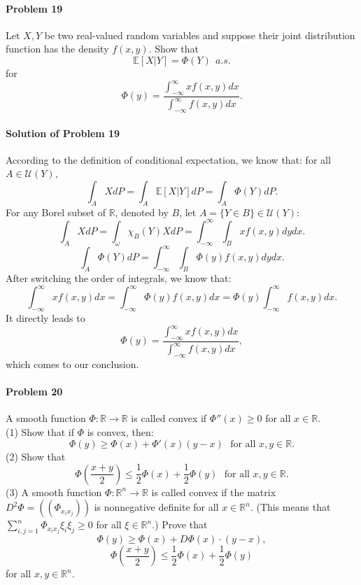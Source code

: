 \documentclass{article}
\begin{document}
\paragraph{Problem 19} Let $X,Y$ be two real-valued random variables and suppose their joint distribution function has the density $f(x,y)$. Show that 
\[\mathbb{E}[X|Y]=\Phi(Y)~~a.s.\]
for
\[\Phi(y)=\frac{\int_{-\infty}^{\infty}xf(x,y)dx}{\int_{-\infty}^{\infty}f(x,y)dx}.\]

\paragraph{Solution of Problem 19} According to the definition of conditional expectation, we know that: for all $A\in\mathcal U(Y)$,
\[\int_A XdP=\int_A \mathbb{E}[X|Y] dP = \int_A \Phi(Y)dP.\]
For any Borel subset of $\mathbb{R}$, denoted by $B$, let $A=\{Y\in B\}\in \mathcal U(Y)$:
\[\int_A XdP=\int_{\omega}\chi_B(Y)XdP=\int_{-\infty}^{\infty}\int_B xf(x,y)dydx.\]
\[\int_A \Phi(Y)dP = \int_{-\infty}^{\infty} \int_B \Phi(y)f(x,y)dydx.\]
After switching the order of integrals, we know that:
\[\int_{-\infty}^{\infty}xf(x,y)dx = \int_{-\infty}^{\infty}\Phi(y)f(x,y)dx = \Phi(y)\int_{-\infty}^{\infty}f(x,y)dx.\]
It directly leads to
\[\Phi(y) = \frac{\int_{-\infty}^{\infty}xf(x,y)dx}{\int_{-\infty}^{\infty}f(x,y)dx},\]
which comes to our conclusion.  

\paragraph{Problem 20} A smooth function $\Phi:\mathbb{R}\rightarrow\mathbb{R}$ is called convex if $\Phi''(x)\geqslant 0$ for all $x\in\mathbb{R}$.\\
(1) Show that if $\Phi$ is convex, then:
\[\Phi(y)\geqslant \Phi(x)+\Phi'(x)(y-x)~~~\text{for all }x,y\in\mathbb{R}.\]
(2) Show that 
\[\Phi\left(\frac{x+y}{2}\right)\leqslant \frac12\Phi(x)+\frac12\Phi(y)~~~\text{for all }x,y\in\mathbb{R}.\]
(3) A smooth function $\Phi:\mathbb{R}^n\rightarrow\mathbb{R}$ is called convex if the matrix $D^2\Phi=((\Phi_{x_i x_j}))$ is nonnegative definite for all $x\in\mathbb{R}^n$. (This means that $\sum_{i,j=1}^n \Phi_{x_i x_j}\xi_i\xi_j\geqslant 0$ for all $\xi\in\mathbb{R}^n$.) Prove that 
\[\Phi(y)\geqslant \Phi(x)+D\Phi(x)\cdot (y-x),\]
\[\Phi\left(\frac{x+y}{2}\right)\leqslant \frac12\Phi(x)+\frac12\Phi(y)\]
for all $x,y\in\mathbb{R}^n$.
\end{document}
